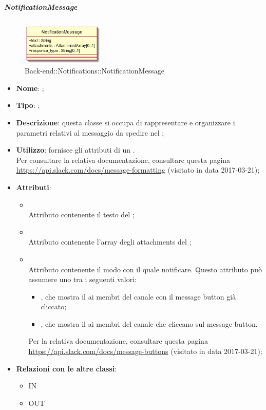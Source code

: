 \hypertarget{NotificationMessage_label}{\subparagraph{NotificationMessage}}
\begin{figure}[h]
	\centering
	\includegraphics[width=0.35\textwidth,height=\textheight,keepaspectratio]{images/ClassNotificationMessage.png}
	\caption{Back-end::Notifications::NotificationMessage}
\end{figure}
\begin{itemize}
	\item \textbf{Nome}: ;
	\item \textbf{Tipo}: ;
	\item \textbf{Descrizione}: questa classe si occupa di rappresentare e organizzare i parametri relativi al messaggio da spedire nel ;
	\item \textbf{Utilizzo}: fornisce gli attributi di un . \\ Per consultare la relativa documentazione, consultare questa pagina \url{https://api.slack.com/docs/message-formatting} (visitato in data 2017-03-21);
	\item \textbf{Attributi}:
	\begin{itemize}
		\item[]  \\
		Attributo contenente il testo del ;
		\item[]  \\
		Attributo contenente l'array degli attachments del ;
		\item[]  \\
		Attributo contenente il modo con il quale notificare.
Questo attributo può assumere uno tra i seguenti valori:
\begin{itemize}
\item {}, che mostra il  ai membri del canale con il message button già cliccato;
\item {}, che mostra il  ai membri del canale che cliccano sul message button.
\end{itemize}
Per la relativa documentazione, consultare questa pagina \url{https://api.slack.com/docs/message-buttons}  (visitato in data 2017-03-21);
	\end{itemize}
	\item \textbf{Relazioni con le altre classi}:
	\begin{itemize}
		\item IN \hyperlink{NotificationService_label}{}
		\item OUT \hyperlink{Attachment_label}{}
	\end{itemize}
\end{itemize}
\FloatBarrier

